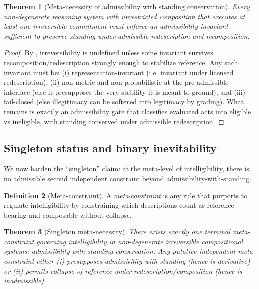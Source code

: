 \documentclass[11pt]{article}
\newtheorem{theorem}{Theorem}[section]
\theoremstyle{definition}
\newtheorem{definition}[theorem]{Definition}
\begin{document}
\begin{theorem}[Meta-necessity of admissibility with standing conservation]
\label{thm:meta-necessity}
Every non-degenerate reasoning system with unrestricted composition that executes at least one irreversible commitment must enforce an admissibility invariant sufficient to preserve standing under admissible redescription and recomposition.
\end{theorem}

\begin{proof}
By , irreversibility is undefined unless some invariant survives recomposition/redescription strongly enough to stabilize reference.
Any such invariant must be:
(i) representation-invariant (i.e. invariant under licensed redescription),
(ii) non-metric and non-probabilistic at the pre-admissible interface (else it presupposes the very stability it is meant to ground), and
(iii) fail-closed (else illegitimacy can be softened into legitimacy by grading).
What remains is exactly an admissibility gate that classifies evaluated acts into eligible vs ineligible, with standing conserved under admissible redescription.
\end{proof}

\subsection{Singleton status and binary inevitability}

We now harden the ``singleton'' claim: at the meta-level of intelligibility, there is no admissible second independent constraint beyond admissibility-with-standing.

\begin{definition}[Meta-constraint]
A \emph{meta-constraint} is any rule that purports to regulate intelligibility by constraining which descriptions count as reference-bearing and composable without collapse.
\end{definition}

\begin{theorem}[Singleton meta-necessity]
\label{thm:singleton}
There exists exactly one terminal meta-constraint governing intelligibility in non-degenerate irreversible compositional systems: admissibility with standing conservation.
Any putative independent meta-constraint either (i) presupposes admissibility-with-standing (hence is derivative) or (ii) permits collapse of reference under redescription/composition (hence is inadmissible).
\end{theorem}
\end{document}
